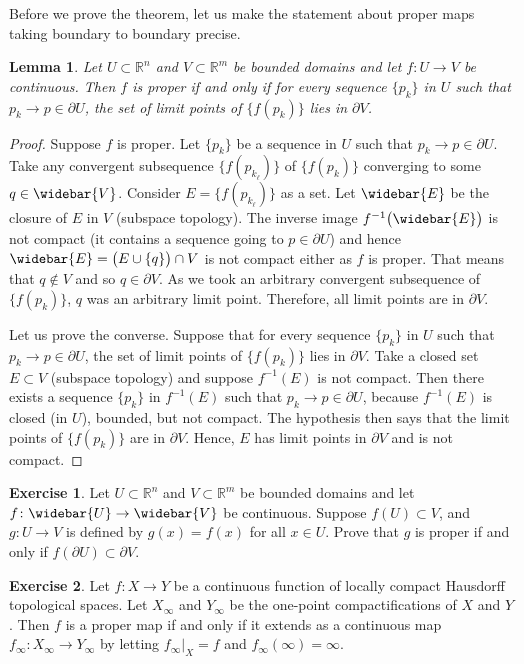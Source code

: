\documentclass[12pt,openany]{book}
\newcommand{\R}{{\mathbb{R}}}
\theoremstyle{plain}
\newtheorem{lemma}[thm]{Lemma}
\theoremstyle{remark}
\theoremstyle{definition}
\newenvironment{exbox}{%
    \def\FrameCommand{\vrule width 1pt \relax\hspace{10pt}}%
    \MakeFramed{\advance\hsize-\width\FrameRestore}%
}{%
    \endMakeFramed
}
\theoremstyle{exercise}
\newtheorem{exercise}{Exercise}[section]
\theoremstyle{example}
\begin{document}
Before we prove the theorem, let us make the statement about
proper maps taking boundary to boundary precise.

\begin{lemma} \label{lemma:bndrytobndry}
Let $U \subset \R^n$ and $V \subset \R^m$ be bounded domains and
let $f \colon U \to V$ be continuous.
Then $f$ is proper if and only if
for every sequence $\{ p_k \}$ in $U$ such that $p_k \to p \in \partial U$,
the set of limit points of $\bigl\{ f(p_k) \bigr\}$ lies in $\partial V$.
\end{lemma}

\begin{proof}
Suppose $f$ is proper.  Let
$\{ p_k \}$ be a sequence in $U$ such that $p_k \to p \in \partial U$.
Take any convergent subsequence $\bigl\{ f(p_{k_\ell}) \bigr\}$ of
$\bigl\{ f(p_k) \bigr\}$
converging to some $q \in \widebar{V}$.  Consider
$E = \bigl\{ f(p_{k_\ell}) \bigr\}$ as a set.
Let $\widebar{E}$ be the closure of $E$
in $V$ (subspace topology).
The inverse image $f^{-1}\bigl(\widebar{E}\bigr)$
is not compact (it contains a sequence going to $p \in \partial U$)
and hence $\widebar{E} = \big( E \cup \{ q \} \bigr) \cap V$ is not
compact either as $f$ is proper.
That means that $q \notin V$ and so $q \in \partial V$.
As we took an arbitrary convergent subsequence of $\bigl\{ f(p_k) \bigr\}$,
$q$ was an arbitrary limit point.
Therefore, all limit points are in $\partial V$.

Let us prove the converse.
Suppose that for every sequence
$\{ p_k \}$ in $U$ such that $p_k \to p \in \partial U$,
the set of limit points of $\bigl\{ f(p_k) \bigr\}$ lies in $\partial V$.
Take a closed set $E \subset V$ (subspace topology) and suppose $f^{-1}(E)$
is not compact.  Then there exists a sequence $\{ p_k \}$ in $f^{-1}(E)$
such that $p_k \to p \in \partial U$, because $f^{-1}(E)$ is closed
(in $U$), bounded, but not compact.
The hypothesis then says that the limit points of
$\bigl\{ f(p_k) \bigr\}$ are in $\partial V$.  Hence, $E$ has limit points in
$\partial V$ and is not compact.
\end{proof}

\begin{exbox}
\begin{exercise}
Let $U \subset \R^n$ and $V \subset \R^m$ be bounded domains and
let $f \colon \widebar{U} \to \widebar{V}$ be continuous.
Suppose $f(U) \subset V$, and $g \colon U \to V$ is defined by
$g(x) = f(x)$ for all $x \in U$.
Prove that $g$ is proper if and only if $f(\partial U) \subset \partial V$.
\end{exercise}

\begin{exercise}
Let $f \colon X \to Y$ be a continuous function of locally compact Hausdorff topological spaces.
Let $X_\infty$ and $Y_\infty$ be the
one-point compactifications of $X$ and $Y$.
Then $f$ is a proper map if and only if it extends as a continuous map
$f_\infty \colon X_\infty \to Y_\infty$ by letting
$f_\infty |_X = f$ and
 $f_\infty(\infty) = \infty$.
\end{exercise}
\end{exbox}
\end{document}
